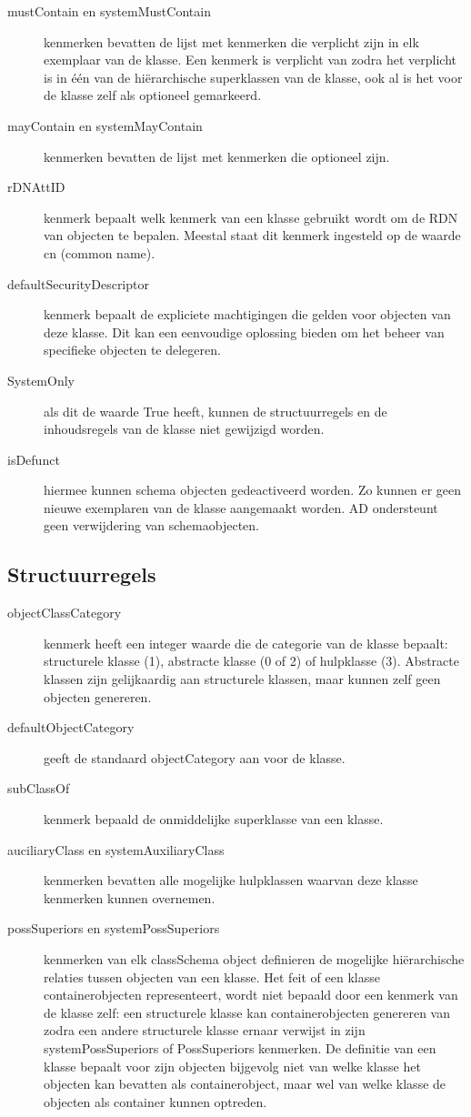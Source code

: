 \begin{description}
	\item[mustContain en systemMustContain] kenmerken bevatten de lijst
		met kenmerken die verplicht zijn in elk exemplaar van de klasse.
		Een kenmerk is verplicht van zodra het verplicht is in één van
		de hiërarchische superklassen van de klasse, ook al is het voor
		de klasse zelf als optioneel gemarkeerd.
	\item[mayContain en systemMayContain] kenmerken bevatten de lijst met
		kenmerken die optioneel zijn.
	\item[rDNAttID] kenmerk bepaalt welk kenmerk van een klasse gebruikt
		wordt om de RDN van objecten te bepalen. Meestal staat dit
		kenmerk ingesteld op de waarde cn (common name).
	\item[defaultSecurityDescriptor] kenmerk bepaalt de expliciete
		machtigingen die gelden voor objecten van deze klasse. Dit kan
		een eenvoudige oplossing bieden om het beheer van specifieke
		objecten te delegeren.
	\item[SystemOnly] als dit de waarde True heeft, kunnen de
		structuurregels en de inhoudsregels van de klasse niet gewijzigd
		worden.
	\item[isDefunct] hiermee kunnen schema objecten gedeactiveerd
		worden. Zo kunnen er geen nieuwe exemplaren van de klasse
		aangemaakt worden. AD ondersteunt geen verwijdering van
		schemaobjecten.
\end{description}

\subsection{Structuurregels}
\begin{description}
	\item[objectClassCategory] kenmerk heeft een integer waarde die de
		categorie van de klasse bepaalt: structurele klasse (1),
		abstracte klasse (0 of 2) of hulpklasse (3). Abstracte klassen
		zijn gelijkaardig aan structurele klassen, maar kunnen zelf geen
		objecten genereren.
	\item[defaultObjectCategory] geeft de standaard objectCategory aan voor
		de klasse.
	\item[subClassOf] kenmerk bepaald de onmiddelijke superklasse van een
		klasse.
	\item[auciliaryClass en systemAuxiliaryClass] kenmerken bevatten alle
		mogelijke hulpklassen waarvan deze klasse kenmerken kunnen
		overnemen.
	\item[possSuperiors en systemPossSuperiors] kenmerken van elk
		classSchema object definieren de mogelijke hiërarchische
		relaties tussen objecten van een klasse. Het feit of een klasse
		containerobjecten representeert, wordt niet bepaald door een
		kenmerk van de klasse zelf: een structurele klasse kan
		containerobjecten genereren van zodra een andere structurele
		klasse ernaar verwijst in zijn systemPossSuperiors of
		PossSuperiors kenmerken. De definitie van een klasse bepaalt
		voor zijn objecten bijgevolg niet van welke klasse het objecten
		kan bevatten als containerobject, maar wel van welke klasse de
		objecten als container kunnen optreden.
\end{description}

